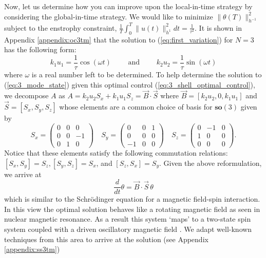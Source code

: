 Now, let us determine how you can improve upon the local-in-time strategy by considering the global-in-time strategy. We would like to minimize
$\| \theta (T) \|^{2}_{h^{-1}}$ subject to the enstrophy constraint, $\frac{1}{T}\int_{0}^{T}\| u(t)\|^{2}_{h^{1}} dt =  \frac{1}{\tau^2}.$ It is shown in Appendix \ref{appendix:oc3tm} that the solution to (\ref{eq:first_variation}) for $N=3$ has the following form: 
\begin{equation}
	\label{eq:3_shell_optimal_control}
	k_{1}u_{1}=\frac{1}{\tau} \cos(\omega t) \qquad \text{ and } \qquad k_{2}u_{2}=\frac{1}{\tau} \sin(\omega t)
\end{equation}
where $\omega$ is a real number left to be determined. To help determine the solution to (\ref{eq:3_mode_state}) given this optimal control (\ref{eq:3_shell_optimal_control}), we  decompose $A$ as
$A=k_{2}u_{2}S_{x}+k_{1}u_{1}S_{z}= \vec{B}\cdot\vec{S} $
where $\vec{B}=[k_{2}u_{2}, 0, k_{1}u_{1} ]$ and  $\vec{S}=[S_{x},S_{y},S_{z}]$ whose elements are a common choice of basis for $\mathbf{so}(3)$ given by
\[
	S_{x}=\left(
	\begin{array}{ccc}
		0 & 0 & 0  \\
		0 & 0 & -1 \\
		0 & 1 & 0
	\end{array}
	\right)
	\quad
	S_{y}=\left(
	\begin{array}{ccc}
		0  & 0 & 1 \\
		0  & 0 & 0 \\
		-1 & 0 & 0
	\end{array}
	\right)
	\quad
	S_{z}=\left(
	\begin{array}{ccc}
		0 & -1 & 0 \\
		1 & 0  & 0 \\
		0 & 0  & 0
	\end{array}
	\right).
\]
Notice that these elements satisfy the following commutation relations: $ [S_{x},S_{y}]=S_{z} ,  [S_{y},S_{z}]=S_{x}$, and  $[S_{z},S_{x}]=S_{y}. $
Given the above reformulation,  we arrive at
\begin{equation}
	\frac{d}{dt}\theta= \vec{B}\cdot\vec{S} \, \theta
\end{equation}
which is similar to the Schr\"odinger equation for a magnetic field-spin interaction. In this view the optimal solution behaves like a rotating magnetic field as seen in nuclear magnetic resonance. As a result this system `maps' to a two-state spin system coupled with a driven oscillatory magnetic field \cite{Feynman2010,Shankar1994,Sakurai1995}. We adapt well-known techniques \cite{rabi1954} from this area to arrive at the solution (see Appendix \ref{appendix:ss3tm})
